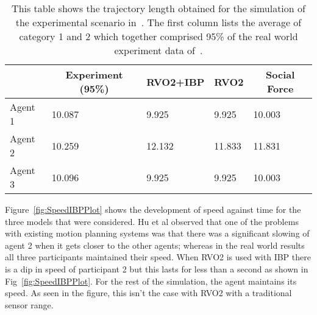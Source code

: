 \begin{table}[!t]
\centering
        \begin{tabular}{p{0.75in}   p{0.75in} p{0.75in} p{0.75in} p{0.75in}}
            \hline
            \multicolumn{1}{c}{} & \multicolumn{1}{c}{Experiment (95\%)} & \multicolumn{1}{c}{RVO2+IBP} & \multicolumn{1}{c}{RVO2} & \multicolumn{1}{c}{Social Force}    \\
            \hline
            \hline
            \multicolumn{1}{l}{Agent 1}  & \multicolumn{1}{l}{10.087} & \multicolumn{1}{l}{9.925} & \multicolumn{1}{l}{9.925} & \multicolumn{1}{l}{10.003}
            \\%
            \multicolumn{1}{l}{Agent 2} & \multicolumn{1}{l}{10.259} & \multicolumn{1}{l}{12.132} & \multicolumn{1}{l}{11.833} & \multicolumn{1}{l}{11.831}
            \\%
            \multicolumn{1}{l}{Agent 3} & \multicolumn{1}{l}{10.096} & \multicolumn{1}{l}{9.925} & \multicolumn{1}{l}{9.925} & \multicolumn{1}{l}{10.003}
            \\%

            \hline
            \hline
        \end{tabular}
    \caption[Simulation trajectory lengths]{This table shows the trajectory length obtained for the simulation of the experimental scenario in~\cite{hunanThesis}. The first column lists the average of category 1 and 2 which together comprised 95\% of the real world experiment data of~\cite{hunanThesis}.}
    \label{tab:SimulationTrajectoryLengths}
\end{table}

Figure~\ref{fig:SpeedIBPPlot} shows the development of speed against time for the three models that were considered. Hu et al observed that one of the problems with existing motion planning systems was that there was a significant slowing of agent 2 when it gets closer to the other agents; whereas in the real world results all three participants maintained their speed. When RVO2 is used with IBP there is a dip in speed of participant 2 but this lasts for less than a second as shown in Fig~\ref{fig:SpeedIBPPlot}. For the rest of the simulation, the agent maintains its speed. As seen in the figure, this isn't the case with RVO2 with a traditional sensor range.



